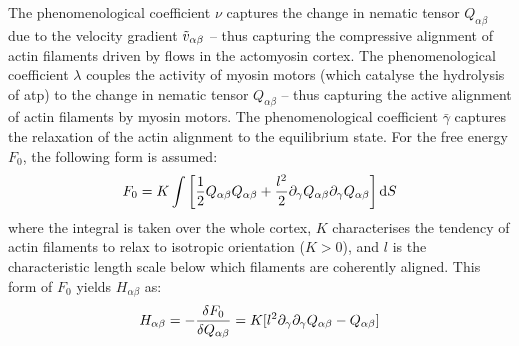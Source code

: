 The phenomenological coefficient $\nu$ captures the change in nematic tensor $Q_{\alpha\beta}$ due to the velocity gradient $\Tilde{v}_{\alpha\beta}$ -- thus capturing the compressive alignment of actin filaments driven by flows in the actomyosin cortex. The phenomenological coefficient $\lambda$ couples the activity of myosin motors (which catalyse the hydrolysis of \ac{atp}) to the change in nematic tensor $Q_{\alpha\beta}$ -- thus capturing the active alignment of actin filaments by myosin motors. The phenomenological coefficient $\bar{\gamma}$ captures the relaxation of the actin alignment to the equilibrium state. For the free energy $F_0$, the following form is assumed:
\begin{equation}\label{eq:nematicFreeEnergyModelAC}
    F_0 = K\int\left[\frac{1}{2}Q_{\alpha\beta}Q_{\alpha\beta} + \frac{l^2}{2}\inlinePartial{\gamma}{Q_{\alpha\beta}}\inlinePartial{\gamma}{Q_{\alpha\beta}}\right]\dd{S}
\end{equation}
where the integral is taken over the whole cortex, $K$ characterises the tendency of actin filaments to relax to isotropic orientation ($K > 0$), and $l$ is the characteristic length scale below which filaments are coherently aligned. This form of $F_0$ yields $H_{\alpha\beta}$ as:
\begin{equation}\label{eq:molecularFieldModelAC}
    H_{\alpha\beta} = -\fdv{F_0}{Q_{\alpha\beta}} = K[l^2\inlinePartial{\gamma}{\inlinePartial{\gamma}{Q_{\alpha\beta}}} - Q_{\alpha\beta}]
\end{equation}

